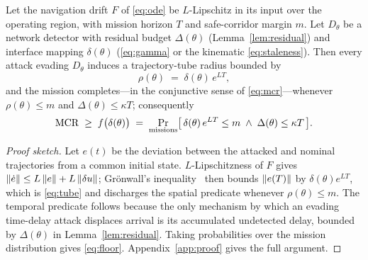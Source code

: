 \begin{theorem}
\label{thm:main}
Let the navigation drift $F$ of \eqref{eq:ode} be $L$-Lipschitz in its input
over the operating region, with mission horizon $T$ and safe-corridor margin
$m$. Let $D_\theta$ be a network detector with residual budget $\Delta(\theta)$
(Lemma~\ref{lem:residual}) and interface mapping $\delta(\theta)$
(\eqref{eq:gamma} or the kinematic \eqref{eq:staleness}). Then every attack
evading $D_\theta$ induces a trajectory-tube radius bounded by
\begin{equation}
\label{eq:tube}
\rho(\theta) \;=\; \delta(\theta)\,e^{L T},
\end{equation}
and the mission completes---in the conjunctive sense of \eqref{eq:mcr}---whenever
$\rho(\theta)\le m$ and $\Delta(\theta)\le\kappa T$; consequently
\begin{equation}
\label{eq:floor}
\mathrm{MCR} \;\ge\; f\big(\delta(\theta)\big) \;=\;
\Pr_{\text{missions}}\!\big[\,\delta(\theta)\,e^{LT}\le m
\;\wedge\; \Delta(\theta)\le\kappa T\,\big].
\end{equation}
\end{theorem}
\begin{proof}[Proof sketch]
Let $e(t)$ be the deviation between the attacked and nominal trajectories from a
common initial state. $L$-Lipschitzness of $F$ gives
$\left\lVert \dot e\right\rVert\le L\left\lVert e\right\rVert+L\left\lVert \delta u\right\rVert$; Gr\"onwall's
inequality~\cite{gronwall1919} then bounds $\left\lVert e(T)\right\rVert$ by
$\delta(\theta)e^{LT}$, which is \eqref{eq:tube} and discharges the spatial
predicate whenever $\rho(\theta)\le m$. The temporal predicate follows because
the only mechanism by which an evading time-delay attack displaces arrival is
its accumulated undetected delay, bounded by $\Delta(\theta)$ in
Lemma~\ref{lem:residual}. Taking probabilities over the mission distribution
gives \eqref{eq:floor}. Appendix~\ref{app:proof} gives the full argument.
\end{proof}

